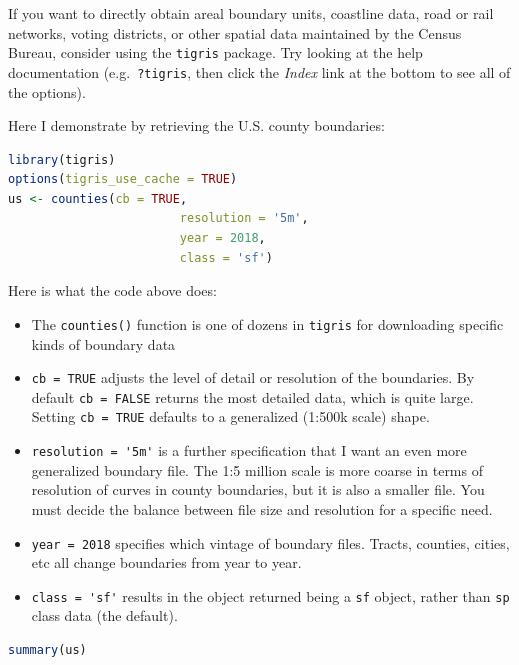 \documentclass[
]{book}
\newcommand{\passthrough}[1]{#1}
\providecommand{\tightlist}{%
  \setlength{\itemsep}{0pt}\setlength{\parskip}{0pt}}
\begin{document}
If you want to directly obtain areal boundary units, coastline data, road or rail networks, voting districts, or other spatial data maintained by the Census Bureau, consider using the \passthrough{\lstinline!tigris!} package. Try looking at the help documentation (e.g.~\passthrough{\lstinline!?tigris!}, then click the \emph{Index} link at the bottom to see all of the options).

Here I demonstrate by retrieving the U.S. county boundaries:

\begin{lstlisting}[language=R]
library(tigris)
options(tigris_use_cache = TRUE)
us <- counties(cb = TRUE,
                        resolution = '5m', 
                        year = 2018,
                        class = 'sf')
\end{lstlisting}

Here is what the code above does:

\begin{itemize}
\tightlist
\item
  The \passthrough{\lstinline!counties()!} function is one of dozens in \passthrough{\lstinline!tigris!} for downloading specific kinds of boundary data
\item
  \passthrough{\lstinline!cb = TRUE!} adjusts the level of detail or resolution of the boundaries. By default \passthrough{\lstinline!cb = FALSE!} returns the most detailed data, which is quite large. Setting \passthrough{\lstinline!cb = TRUE!} defaults to a generalized (1:500k scale) shape.
\item
  \passthrough{\lstinline!resolution = '5m'!} is a further specification that I want an even more generalized boundary file. The 1:5 million scale is more coarse in terms of resolution of curves in county boundaries, but it is also a smaller file. You must decide the balance between file size and resolution for a specific need.
\item
  \passthrough{\lstinline!year = 2018!} specifies which vintage of boundary files. Tracts, counties, cities, etc all change boundaries from year to year.
\item
  \passthrough{\lstinline!class = 'sf'!} results in the object returned being a \passthrough{\lstinline!sf!} object, rather than \passthrough{\lstinline!sp!} class data (the default).
\end{itemize}

\begin{lstlisting}[language=R]
summary(us)
\end{lstlisting}
\end{document}
